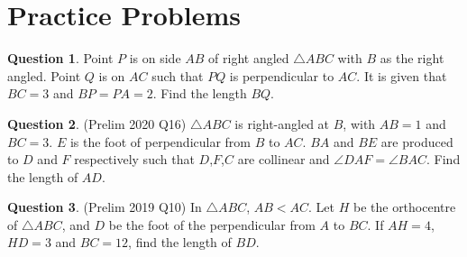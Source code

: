 \documentclass{article}
\theoremstyle{definition}
\newtheorem{question}{Question}
\begin{document}
\section{Practice Problems}
	\begin{question}
		Point $P$ is on side $AB$ of right angled $\triangle ABC$ with $B$ as the right angled. Point $Q$ is on $AC$ such that $PQ$ is perpendicular to $AC$. It is given that $BC=3$ and $BP=PA=2$. Find the length $BQ$.
	\end{question}	
	\vfill
	\begin{question}
		(Prelim 2020 Q16) $\triangle ABC$ is right-angled at $B$, with $AB=1$ and $BC=3$. $E$ is the foot of perpendicular from $B$ to $AC$. $BA$ and $BE$ are produced to $D$ and $F$ respectively such that $D$,$F$,$C$ are collinear and $\angle DAF = \angle BAC$. Find the length of $AD$.
	\end{question}
	\vfill
	\newpage
	\begin{question}
		(Prelim 2019 Q10)	In $\triangle ABC$, $AB < AC$. Let $H$ be the orthocentre of $\triangle ABC$, and  $D$ be the foot of the perpendicular from $A$ to $BC$. If $AH=4$,$HD=3$ and $BC=12$, find the length of $BD$.
	\end{question}
\end{document}
